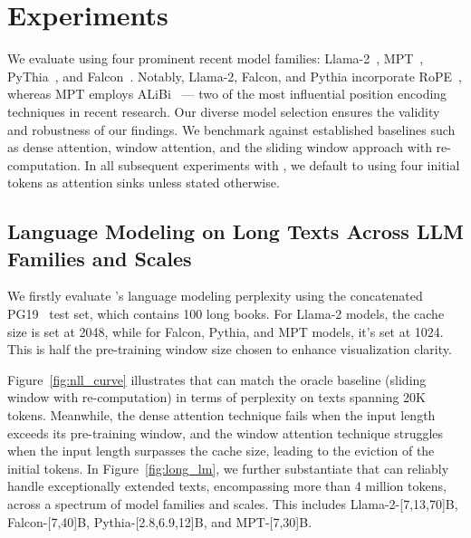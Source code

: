 \section{Experiments}
\label{sec:exps}
We evaluate \method using four prominent recent model families: Llama-2~\citep{touvron2023llama2}, MPT~\citep{MosaicML2023Introducing}, PyThia~\citep{biderman2023pythia}, and Falcon~\citep{falcon40b}. Notably, Llama-2, Falcon, and Pythia incorporate RoPE~\citep{su2021roformer}, whereas MPT employs ALiBi~\citep{alibi} — two of the most influential position encoding techniques in recent research. Our diverse model selection ensures the validity and robustness of our findings. We benchmark \method against established baselines such as dense attention, window attention, and the sliding window approach with re-computation. In all subsequent experiments with \method, we default to using four initial tokens as attention sinks unless stated otherwise.
\subsection{Language Modeling on Long Texts Across LLM Families and Scales}
We firstly evaluate \method's language modeling perplexity using the concatenated PG19~\citep{Rae2020Compressive} test set, which contains 100 long books. For Llama-2 models, the cache size is set at 2048, while for Falcon, Pythia, and MPT models, it's set at 1024. This is half the pre-training window size chosen to enhance visualization clarity.

Figure~\ref{fig:nll_curve} illustrates that \method can match the oracle baseline (sliding window with re-computation) in terms of perplexity on texts spanning 20K tokens. Meanwhile, the dense attention technique fails when the input length exceeds its pre-training window, and the window attention technique struggles when the input length surpasses the cache size, leading to the eviction of the initial tokens.
In Figure~\ref{fig:long_lm}, we further substantiate that \method can reliably handle exceptionally extended texts, encompassing more than 4 million tokens, across a spectrum of model families and scales. This includes Llama-2-[7,13,70]B, Falcon-[7,40]B, Pythia-[2.8,6.9,12]B, and MPT-[7,30]B.


